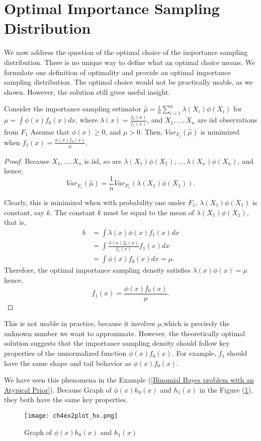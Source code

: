 \section{Optimal Importance Sampling Distribution}
We now address the question of the optimal choice of the importance sampling
distribution. There is no unique way to define what an optimal choice means. We
formulate one definition of optimality and provide an optimal importance sampling
distribution. The optimal choice would not be practically usable, as we shown.
However, the solution still gives useful insight.

\begin{theorem}
	Consider the importance sampling estimator $\hat{\mu} = \frac{1}{n}\sum_{i=1}^{n} \lambda(X_i)\phi(X_i) $ for $\mu=\int \phi(x)f_0(x)dx $, where
	$\lambda(x) =\frac{f_0(x)}{f_1(x)}$, and $X_1,\ldots,X_n$ are iid observations from $F_1$
	Assume that $\phi(x)\ge0$, and $\mu>0$. Then, $Var_{F_1}(\hat{\mu})$ is
	minimized when $f_1(x)=\frac{\phi(x)f_0(x)}{\mu}$.
\end{theorem}
\begin{proof}
	Because $X_1,\ldots,X_n$ is iid, so are $\lambda(X_1)\phi(X_1),\ldots,\lambda(X_n)\phi(X_n)$, and hence,
	\[
		Var_{F_1}(\hat{\mu}) = \frac{1}{n} Var_{F_1}(\lambda(X_1)\phi(X_1))
		.
	\]

	Clearly, this is minimized when with probability one under $F_1$, $\lambda(X_1)\phi(X_1)$
	is constant, say $k$. The constant $k$ must be equal to the mean of $\lambda(X_1)\phi(X_1)$, that is,
	\begin{align*}
		k & = \int \lambda(x)\phi(x)f_1(x)dx              \\
		  & = \int \frac{\phi(x)f_0(x)}{f_1(x)} f_1(x) dx \\
		  & = \int \phi(x)f_0(x)dx = \mu.
	\end{align*}
	Therefore, the optimal importance sampling density satisfies $\lambda(x)\phi(x) = \mu$
	hence,
	\[
		f_1(x) = \frac{\phi(x)f_0(x)}{\mu}.
	\]
\end{proof}
This is not usable in practice, because it involves $\mu$,which is precisely the unknown number we want to approximate.
However, the theoretically optimal solution
suggests that the importance sampling density should follow key properties of the
unnormalized function $\phi(x)f_0(x)$.
For example, $f_1$ should have the same shape and tail behavior as $\phi(x)f_0(x)$.

We have seen this phenomena in the Example (\ref{Binomial Bayes problem with an Atypical Prior}).
Because Graph of $\phi(x)h_0(x)$ and $h_1(x)$ in the Figure (\ref{fig:ch4ex2plothx}), they both have the same key properties.   
\begin{figure}[H]
    \centering
    \texttt{[image: ch4ex2plot\_hx.png]}
    \caption{Graph of $\phi(x)h_0(x)$ and $h_1(x)$}
    \label{fig:ch4ex2plothx}
\end{figure}
